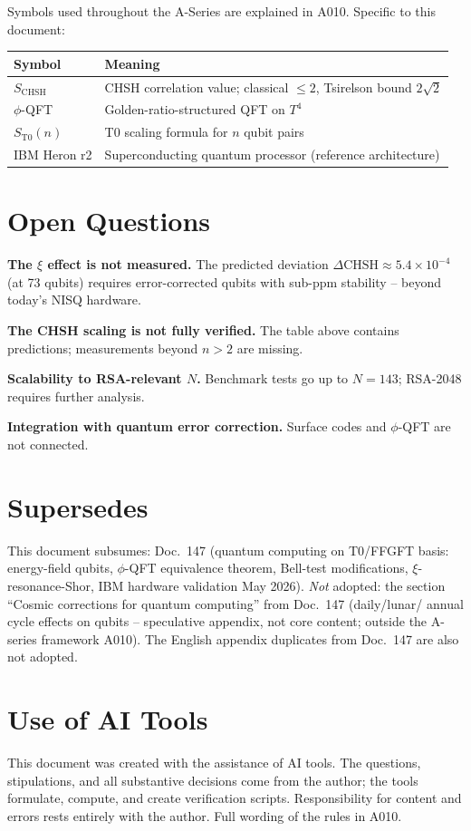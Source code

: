 Symbols used throughout the A-Series are explained in A010.
Specific to this document:

\begin{center}
\renewcommand{\arraystretch}{1.3}
{\small\begin{tabular}{lp{9cm}}
\toprule
Symbol & Meaning \\
\midrule
$S_\text{CHSH}$ & CHSH correlation value; classical $\leq2$, Tsirelson bound $2\sqrt2$ \\
$\phi$-QFT & Golden-ratio-structured QFT on $T^4$ \\
$S_\text{T0}(n)$ & T0 scaling formula for $n$ qubit pairs \\
IBM Heron r2 & Superconducting quantum processor (reference architecture) \\
\bottomrule
\end{tabular}}
\renewcommand{\arraystretch}{1.0}
\end{center}

\section{Open Questions}

\textbf{The $\xi$ effect is not measured.} The predicted deviation
$\Delta\text{CHSH}\approx5{.}4\times10^{-4}$ (at 73 qubits) requires error-corrected
qubits with sub-ppm stability -- beyond today's NISQ hardware.

\textbf{The CHSH scaling is not fully verified.} The table above contains
predictions; measurements beyond $n>2$ are missing.

\textbf{Scalability to RSA-relevant $N$.} Benchmark tests go up to $N=143$; RSA-2048
requires further analysis.

\textbf{Integration with quantum error correction.} Surface codes and $\phi$-QFT
are not connected.

\section{Supersedes}

This document subsumes: Doc.~147 (quantum computing on T0/FFGFT basis:
energy-field qubits, $\phi$-QFT equivalence theorem, Bell-test modifications,
$\xi$-resonance-Shor, IBM hardware validation May 2026). \emph{Not} adopted:
the section ``Cosmic corrections for quantum computing'' from Doc.~147 (daily/lunar/
annual cycle effects on qubits -- speculative appendix, not core content;
outside the A-series framework A010). The English appendix duplicates from
Doc.~147 are also not adopted.

\section{Use of AI Tools}

This document was created with the assistance of AI tools. The questions,
stipulations, and all substantive decisions come from the author; the tools
formulate, compute, and create verification scripts.
Responsibility for content and errors rests entirely with the author.
Full wording of the rules in A010.
